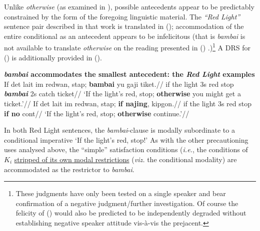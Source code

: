 \xe





Unlike \textit{otherwise} (as examined in \citealp{PhilKotek}), possible antecedents appear to be predictably constrained by the form of the foregoing linguistic material. The \textit{``Red Light''} sentence pair described in that work is translated in (\nextx); accommodation of the entire conditional as an antecedent appears to be infelicitous (that is \textit{bambai} is not available to translate \textit{otherwise} on the reading presented in () \citealp[\textit{cf.}][]{PhilKotek,Webber2003,Kruijff-Korbayova2001}.)\footnote{These judgments have only been tested on a single speaker and bear confirmation of a negative judgment/further investigation. Of course the felicity of () would also be predicted to be independently degraded without establishing negative speaker attitude vis-à-vis the prejacent.} A DRS for () is additionally provided in ().


	\pex \textbf{\textit{bambai} accommodates the smallest antecedent: the \textit{Red Light} examples }
\a\begingl
\gla If det lait im redwan, stap; \textbf{bambai} yu gaji tiket.//
\glb if the light 3s red stop \textit{\textbf{bambai}} 2s catch ticket//
\glft`If the light's red, stop; \textbf{otherwise} you might get a ticket.'//
\endgl
\a\begingl\gla	If det lait im redwan, stap; \textbf{if najing}, kipgon.//
\glb if the light 3s red stop \textbf{if no} {\sc cont}//
\glft`If the light's red, stop; \textbf{otherwise} continue.'\trailingcitation{[GT~19032017]}//
\endgl\xe

In both Red Light sentences, the \textit{bambai}-clause is modally subordinate to a conditional imperative `If the light's red, stop!' As with the other precautioning uses analysed above, the ``simple'' satisfaction conditions (\textit{i.e.}, the conditions of $ K_i $ \ul{stripped of its own modal restrictions} (\textit{viz.} the conditional modality)
 are accommodated as the restrictor to \textit{bambai}.%

